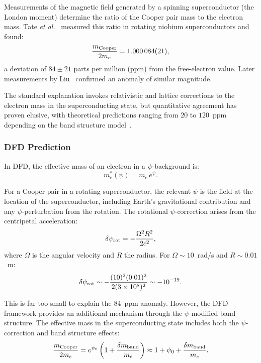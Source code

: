 \documentclass[aps,prb,twocolumn,superscriptaddress,floatfix,nofootinbib,longbibliography]{revtex4-2}
\begin{document}
Measurements of the magnetic field generated by a spinning
superconductor (the London moment) determine the ratio of the Cooper
pair mass to the electron mass.  Tate \textit{et al.}~\cite{Tate1989,Tate1990}
measured this ratio in rotating niobium superconductors and found:
\begin{equation}
\frac{m_{\rm Cooper}}{2m_e} = 1.000\,084(21),
\label{eq:tate}
\end{equation}
a deviation of $84 \pm 21$ parts per million (ppm) from the free-electron
value.  Later measurements by Liu~\cite{Liu1998} confirmed an anomaly
of similar magnitude.

The standard explanation invokes relativistic and lattice corrections to
the electron mass in the superconducting state, but quantitative
agreement has proven elusive, with theoretical predictions ranging from
$20$ to $120$~ppm depending on the band structure
model~\cite{Amin2001,Hirsch2013}.

\subsubsection{DFD Prediction}

In DFD, the effective mass of an electron in a $\psi$-background is:
\begin{equation}
m_e^*(\psi) = m_e\,e^{\psi}.
\label{eq:me-eff}
\end{equation}

For a Cooper pair in a rotating superconductor, the relevant $\psi$ is
the field at the location of the superconductor, including Earth's
gravitational contribution and any $\psi$-perturbation from the rotation.
The rotational $\psi$-correction arises from the centripetal acceleration:
\begin{equation}
\delta\psi_{\rm rot} = -\frac{\Omega^2 R^2}{2c^2},
\label{eq:psi-rot}
\end{equation}
where $\Omega$ is the angular velocity and $R$ the radius.  For
$\Omega \sim 10$~rad/s and $R \sim 0.01$~m:
\begin{equation}
\delta\psi_{\rm rot} \sim -\frac{(10)^2(0.01)^2}{2(3\times 10^8)^2}
\sim -10^{-19}.
\label{eq:psi-rot-num}
\end{equation}

This is far too small to explain the $84$~ppm anomaly.  However, the DFD
framework provides an additional mechanism through the $\psi$-modified
band structure.  The effective mass in the superconducting state includes
both the $\psi$-correction and band structure effects:
\begin{equation}
\frac{m_{\rm Cooper}}{2m_e} = e^{\psi_0}\left(1 + \frac{\delta m_{\rm band}}{m_e}\right)
\approx 1 + \psi_0 + \frac{\delta m_{\rm band}}{m_e}.
\label{eq:cooper-mass-dfd}
\end{equation}
\end{document}
